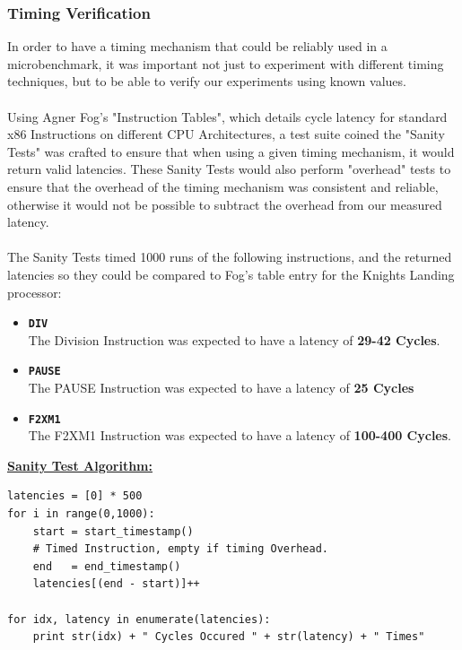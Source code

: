 \documentclass[bsc,frontabs,twoside,singlespacing,parskip,deptreport]{infthesis}     %
\begin{document}
\subsubsection{Timing Verification}
In order to have a timing mechanism that could be reliably used in a microbenchmark, it was important not just to experiment with different timing techniques, but to be able to verify our experiments using known values. \\
\\
Using Agner Fog's "Instruction Tables"\cite{inst_tables}, which details cycle latency for standard x86 Instructions on different CPU Architectures, a test suite coined the "Sanity Tests" was crafted to ensure that when using a given timing mechanism, it would return valid latencies. These Sanity Tests would also perform "overhead" tests to ensure that the overhead of the timing mechanism was consistent and reliable, otherwise it would not be possible to subtract the overhead from our measured latency. \\
\\
The Sanity Tests timed 1000 runs of the following instructions, and the returned latencies so they could be compared to Fog's table entry for the Knights Landing processor:
\begin{itemize}
    \item{{\bf \texttt{DIV}} \\
        The Division Instruction was expected to have a latency of \textbf{29-42 Cycles}.
    }
    \item{{\bf \texttt{PAUSE}} \\
        The PAUSE Instruction was expected to have a latency of \textbf{25 Cycles}
    }
    \item{{\bf \texttt{F2XM1}} \\
        The F2XM1 Instruction was expected to have a latency of \textbf{100-400 Cycles}.
    }
\end{itemize}

\underline{\textbf{Sanity Test Algorithm:}} \\
\begin{verbatim}
latencies = [0] * 500
for i in range(0,1000):
    start = start_timestamp()
    # Timed Instruction, empty if timing Overhead.
    end   = end_timestamp()
    latencies[(end - start)]++

for idx, latency in enumerate(latencies):
    print str(idx) + " Cycles Occured " + str(latency) + " Times"

\end{verbatim}
\end{document}
